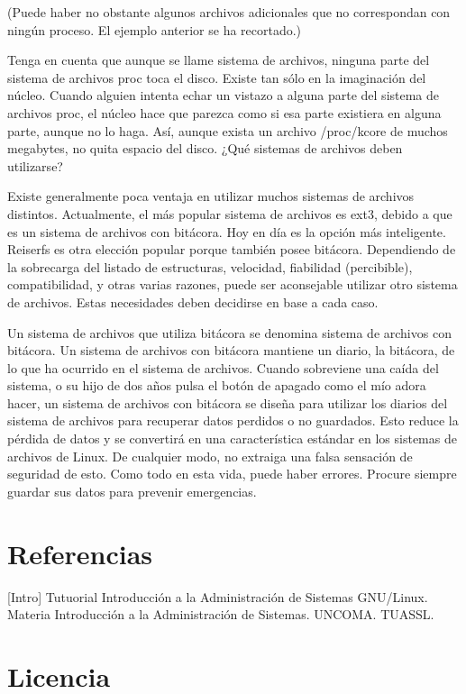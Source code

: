 \documentclass[12pt]{article}
\begin{document}
(Puede haber no obstante algunos archivos adicionales que no correspondan con ningún proceso. El ejemplo anterior se ha recortado.)

Tenga en cuenta que aunque se llame sistema de archivos, ninguna parte del sistema de archivos proc toca el disco. Existe tan sólo en la imaginación del núcleo. Cuando alguien intenta echar un vistazo a alguna parte del sistema de archivos proc, el núcleo hace que parezca como si esa parte existiera en alguna parte, aunque no lo haga. Así, aunque exista un archivo /proc/kcore de muchos megabytes, no quita espacio del disco.
¿Qué sistemas de archivos deben utilizarse?

Existe generalmente poca ventaja en utilizar muchos sistemas de archivos distintos. Actualmente, el más popular sistema de archivos es ext3, debido a que es un sistema de archivos con bitácora. Hoy en día es la opción más inteligente. Reiserfs es otra elección popular porque también posee bitácora. Dependiendo de la sobrecarga del listado de estructuras, velocidad, fiabilidad (percibible), compatibilidad, y otras varias razones, puede ser aconsejable utilizar otro sistema de archivos. Estas necesidades deben decidirse en base a cada caso.

Un sistema de archivos que utiliza bitácora se denomina sistema de archivos con bitácora. Un sistema de archivos con bitácora mantiene un diario, la bitácora, de lo que ha ocurrido en el sistema de archivos. Cuando sobreviene una caída del sistema, o su hijo de dos años pulsa el botón de apagado como el mío adora hacer, un sistema de archivos con bitácora se diseña para utilizar los diarios del sistema de archivos para recuperar datos perdidos o no guardados. Esto reduce la pérdida de datos y se convertirá en una característica estándar en los sistemas de archivos de Linux. De cualquier modo, no extraiga una falsa sensación de seguridad de esto. Como todo en esta vida, puede haber errores. Procure siempre guardar sus datos para prevenir emergencias.



\section*{Referencias}

[Intro] Tutuorial Introducción a la Administración de Sistemas GNU/Linux. Materia Introducción
a la Administración de Sistemas. UNCOMA. TUASSL. 

\section*{Licencia}
\end{document}
